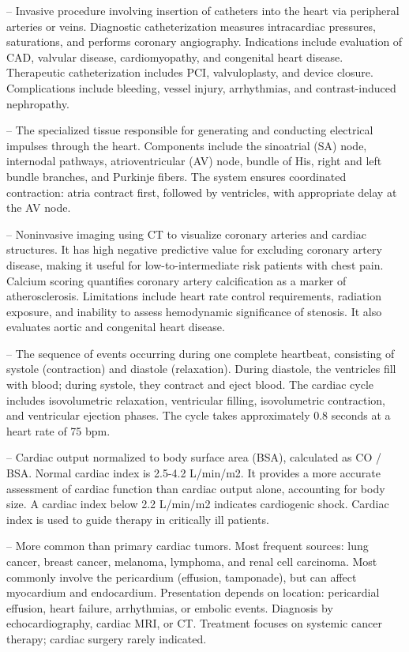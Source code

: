 -- Invasive procedure involving insertion of catheters into the heart via peripheral arteries or veins. Diagnostic catheterization measures intracardiac pressures, saturations, and performs coronary angiography. Indications include evaluation of CAD, valvular disease, cardiomyopathy, and congenital heart disease. Therapeutic catheterization includes PCI, valvuloplasty, and device closure. Complications include bleeding, vessel injury, arrhythmias, and contrast-induced nephropathy.

-- The specialized tissue responsible for generating and conducting electrical impulses through the heart. Components include the sinoatrial (SA) node, internodal pathways, atrioventricular (AV) node, bundle of His, right and left bundle branches, and Purkinje fibers. The system ensures coordinated contraction: atria contract first, followed by ventricles, with appropriate delay at the AV node.

-- Noninvasive imaging using CT to visualize coronary arteries and cardiac structures. It has high negative predictive value for excluding coronary artery disease, making it useful for low-to-intermediate risk patients with chest pain. Calcium scoring quantifies coronary artery calcification as a marker of atherosclerosis. Limitations include heart rate control requirements, radiation exposure, and inability to assess hemodynamic significance of stenosis. It also evaluates aortic and congenital heart disease.

-- The sequence of events occurring during one complete heartbeat, consisting of systole (contraction) and diastole (relaxation). During diastole, the ventricles fill with blood; during systole, they contract and eject blood. The cardiac cycle includes isovolumetric relaxation, ventricular filling, isovolumetric contraction, and ventricular ejection phases. The cycle takes approximately 0.8 seconds at a heart rate of 75 bpm.

-- Cardiac output normalized to body surface area (BSA), calculated as CO / BSA. Normal cardiac index is 2.5-4.2 L/min/m2. It provides a more accurate assessment of cardiac function than cardiac output alone, accounting for body size. A cardiac index below 2.2 L/min/m2 indicates cardiogenic shock. Cardiac index is used to guide therapy in critically ill patients.

-- More common than primary cardiac tumors. Most frequent sources: lung cancer, breast cancer, melanoma, lymphoma, and renal cell carcinoma. Most commonly involve the pericardium (effusion, tamponade), but can affect myocardium and endocardium. Presentation depends on location: pericardial effusion, heart failure, arrhythmias, or embolic events. Diagnosis by echocardiography, cardiac MRI, or CT. Treatment focuses on systemic cancer therapy; cardiac surgery rarely indicated.

